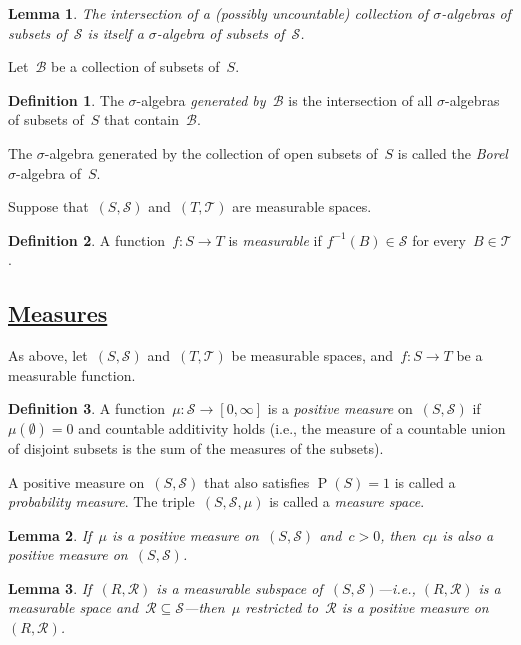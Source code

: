 \documentclass[11pt,a4paper]{article}
\newcommand\mc[1]{\mathcal{#1}}                  %
\DeclareMathOperator\Pb{P}                       %
\newtheorem{lem}{Lemma}
\theoremstyle{definition}
\newtheorem{defn}{Definition}
\begin{document}
\begin{lem}
The intersection of a (possibly uncountable) collection of $\sigma$-algebras of
subsets of~$\mc{S}$ is itself a $\sigma$-algebra of subsets of~$\mc{S}$.
\end{lem}

Let~$\mc{B}$ be a collection of subsets of~$S$.
\begin{defn}
The $\sigma$-algebra \emph{generated by~$\mc{B}$} is the intersection of all
$\sigma$-algebras of subsets of~$S$ that contain~$\mc{B}$.
\end{defn}
The $\sigma$-algebra generated by the collection of open subsets of~$S$ is
called the \emph{Borel} $\sigma$-algebra of~$S$.

Suppose that~$(S,\mc{S})$ and~$(T,\mc{T})$ are measurable spaces.
\begin{defn}
A function~$f\colon S \to T$ is \emph{measurable} if $f^{-1}(B) \in \mc{S}$ for
every~$B \in \mc{T}$.
\end{defn}

\subsection %
  {\href{http://www.randomservices.org/random/prob/Measure.html}
  {Measures}}

As above, let~$(S,\mc{S})$ and~$(T,\mc{T})$ be measurable spaces, and~$f\colon S
\to T$ be a measurable function.
\begin{defn}
A function~$\mu\colon \mc{S} \to [0,\infty]$ is a \emph{positive measure}
on~$(S,\mc{S})$ if $\mu(\emptyset) = 0$ and countable additivity holds (i.e.,
the measure of a countable union of disjoint subsets is the sum of the measures
of the subsets).
\end{defn}
A positive measure on~$(S,\mc{S})$ that also satisfies $\Pb(S) = 1$ is called a
\emph{probability measure}. The triple~$(S,\mc{S},\mu)$ is called a
\emph{measure space}.

\begin{lem}
If~$\mu$ is a positive measure on~$(S,\mc{S})$ and~$c > 0$, then~$c\mu$ is also
a positive measure on~$(S,\mc{S})$.
\end{lem}

\begin{lem}
If~$(R,\mc{R})$ is a measurable subspace of~$(S,\mc{S})$---i.e., $(R,\mc{R})$ is
a measurable space and~$\mc{R} \subseteq \mc{S}$---then~$\mu$ restricted
to~$\mc{R}$ is a positive measure on~$(R,\mc{R})$.
\end{lem}
\end{document}

